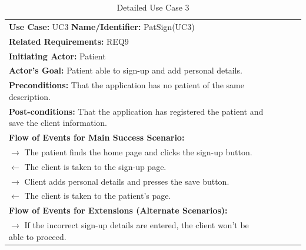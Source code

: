 \documentclass[a4paper]{article}
\begin{document}
\FloatBarrier

\begin{table}[h!]
\centering
\caption*{Detailed Use Case 3}
\label{DetailedUC4}
\begin{tabular}{|c|llll}
\cline{1-1}

\multicolumn{1}{|l|}{\textbf{Use Case:} UC3 \textbf{Name/Identifier:} PatSign(UC3)} &  &  &  &  \\ \cline{1-1}

\multicolumn{1}{|l|}{\textbf{Related Requirements:} REQ9} &  &  &  &  \\

\multicolumn{1}{|l|}{\textbf{Initiating Actor:} Patient} &  &  &  &  \\

\multicolumn{1}{|l|}{\textbf{Actor’s Goal:} Patient able to sign-up and add personal details.} &  &  &  &  \\

\multicolumn{1}{|l|}{\textbf{Preconditions:} That the application has no patient of the same description.} &  &  &  &  \\

\multicolumn{1}{|l|}{\textbf{Post-conditions:} That the application has registered the patient and save the client information.} &  &  &  &  \\

\multicolumn{1}{|l|}{\textbf{Flow of Events for Main Success Scenario:}} &  &  &  &  \\

\multicolumn{1}{|l|}{ $ \rightarrow $ The patient finds the home page and clicks the sign-up button.} &  &  &  &  \\

\multicolumn{1}{|l|}{ $ \leftarrow $ The client is taken to the sign-up page.} &  &  &  &  \\

\multicolumn{1}{|l|}{ $ \rightarrow $ Client adds personal details and presses the save button.} &  &  &  &  \\

\multicolumn{1}{|l|}{ $ \leftarrow $  The client is taken to the patient's page. } &  &  &  &  \\

\multicolumn{1}{|l|}{\textbf{Flow of Events for Extensions (Alternate Scenarios):}} &  &  &  &  \\

\multicolumn{1}{|l|}{ $ \rightarrow $ If the incorrect sign-up details are entered, the client won't be able to proceed.} &  &  &  &  \\ \cline{1-1}

\end{tabular}
\end{table}
\end{document}
